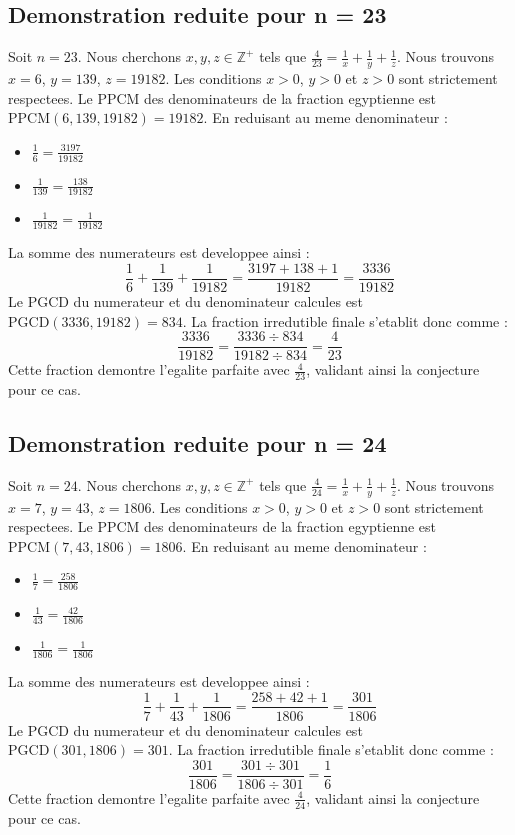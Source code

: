 \documentclass[11pt,a4paper]{article}
\begin{document}
\subsection{Demonstration reduite pour n = 23}
Soit $n = 23$. Nous cherchons $x, y, z \in \mathbb{Z}^{+}$ tels que $\frac{4}{23} = \frac{1}{x} + \frac{1}{y} + \frac{1}{z}$.
Nous trouvons $x = 6$, $y = 139$, $z = 19182$.
Les conditions $x > 0$, $y > 0$ et $z > 0$ sont strictement respectees.
Le PPCM des denominateurs de la fraction egyptienne est $\text{PPCM}(6, 139, 19182) = 19182$.
En reduisant au meme denominateur :
\begin{itemize}
    \item $\frac{1}{6} = \frac{3197}{19182}$
    \item $\frac{1}{139} = \frac{138}{19182}$
    \item $\frac{1}{19182} = \frac{1}{19182}$
\end{itemize}
La somme des numerateurs est developpee ainsi :
$$ \frac{1}{6} + \frac{1}{139} + \frac{1}{19182} = \frac{3197 + 138 + 1}{19182} = \frac{3336}{19182} $$
Le PGCD du numerateur et du denominateur calcules est $\text{PGCD}(3336, 19182) = 834$.
La fraction irredutible finale s'etablit donc comme :
$$ \frac{3336}{19182} = \frac{3336 \div 834}{19182 \div 834} = \frac{4}{23} $$
Cette fraction demontre l'egalite parfaite avec $\frac{4}{23}$, validant ainsi la conjecture pour ce cas.

\subsection{Demonstration reduite pour n = 24}
Soit $n = 24$. Nous cherchons $x, y, z \in \mathbb{Z}^{+}$ tels que $\frac{4}{24} = \frac{1}{x} + \frac{1}{y} + \frac{1}{z}$.
Nous trouvons $x = 7$, $y = 43$, $z = 1806$.
Les conditions $x > 0$, $y > 0$ et $z > 0$ sont strictement respectees.
Le PPCM des denominateurs de la fraction egyptienne est $\text{PPCM}(7, 43, 1806) = 1806$.
En reduisant au meme denominateur :
\begin{itemize}
    \item $\frac{1}{7} = \frac{258}{1806}$
    \item $\frac{1}{43} = \frac{42}{1806}$
    \item $\frac{1}{1806} = \frac{1}{1806}$
\end{itemize}
La somme des numerateurs est developpee ainsi :
$$ \frac{1}{7} + \frac{1}{43} + \frac{1}{1806} = \frac{258 + 42 + 1}{1806} = \frac{301}{1806} $$
Le PGCD du numerateur et du denominateur calcules est $\text{PGCD}(301, 1806) = 301$.
La fraction irredutible finale s'etablit donc comme :
$$ \frac{301}{1806} = \frac{301 \div 301}{1806 \div 301} = \frac{1}{6} $$
Cette fraction demontre l'egalite parfaite avec $\frac{4}{24}$, validant ainsi la conjecture pour ce cas.
\end{document}
